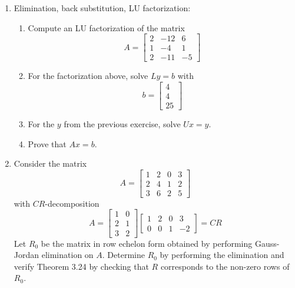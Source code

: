 \documentclass{article}
\begin{document}
\begin{enumerate}
\item Elimination, back substitution, LU factorization:
\begin{enumerate}
    \item Compute an LU factorization of the matrix
    $$
    A = \begin{bmatrix}
        2 & -12 & 6 \\
        1 & -4 & 1 \\
        2 & -11 & -5
    \end{bmatrix}
    $$
    \item For the factorization above, solve $Ly = b$ with
    $$
    b = \begin{bmatrix}
        4 \\ 4 \\ 25
    \end{bmatrix}
    $$
    \item For the $y$ from the previous exercise, solve $Ux = y$.
    \item Prove that $Ax = b$.
\end{enumerate}
\item Consider the matrix
    $$
    A = \begin{bmatrix}
        1 & 2 & 0 & 3 \\
        2 & 4 & 1 & 2 \\
        3 & 6 & 2 & 5
    \end{bmatrix}
    $$
    with $CR$-decomposition
    $$
    A = \begin{bmatrix}
        1 & 0 \\ 2 & 1 \\ 3 & 2
    \end{bmatrix}\begin{bmatrix}
        1 & 2 & 0 & 3 \\
        0 & 0 & 1 & -2
    \end{bmatrix} = CR
    $$
    Let $R_0$ be the matrix in row echelon form obtained by performing Gauss-Jordan elimination on $A$. Determine $R_0$ by performing the elimination and verify Theorem 3.24 by checking that $R$ corresponds to the non-zero rows of $R_0$.
\end{enumerate}
\end{document}
